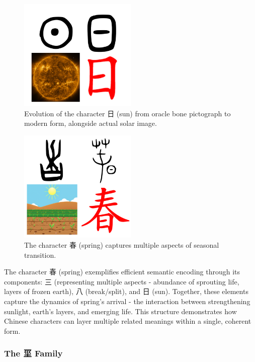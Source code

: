 \documentclass[11pt,letterpaper]{article}
\begin{document}
\begin{figure}
\centering
\includegraphics[width=0.5\textwidth]{./images/zi_sun.png}
\caption{Evolution of the character 日 (sun) from oracle bone pictograph
to modern form, alongside actual solar image.}
\end{figure}

\begin{figure}
\centering
\includegraphics[width=0.5\textwidth]{./images/zi_spring.png}
\caption{The character 春 (spring) captures multiple aspects of seasonal
transition.}
\end{figure}

The character 春 (spring) exemplifies efficient semantic encoding
through its components: 三 (representing multiple aspects - abundance of
sprouting life, layers of frozen earth), 八 (break/split), and 日 (sun).
Together, these elements capture the dynamics of spring's arrival - the
interaction between strengthening sunlight, earth's layers, and emerging
life. This structure demonstrates how Chinese characters can layer
multiple related meanings within a single, coherent form.

\subsubsection{The 坙 Family}\label{the-ux5759-family}
\end{document}
